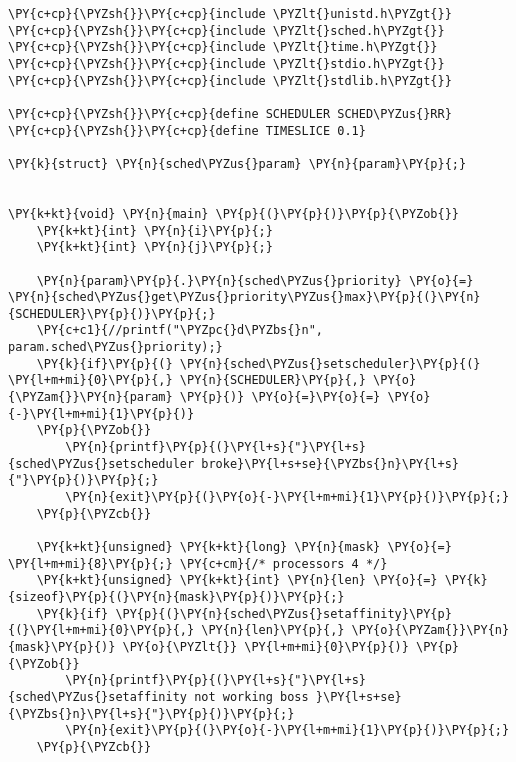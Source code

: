 \begin{Verbatim}[commandchars=\\\{\}]
\PY{c+cp}{\PYZsh{}}\PY{c+cp}{include \PYZlt{}unistd.h\PYZgt{}}
\PY{c+cp}{\PYZsh{}}\PY{c+cp}{include \PYZlt{}sched.h\PYZgt{}}
\PY{c+cp}{\PYZsh{}}\PY{c+cp}{include \PYZlt{}time.h\PYZgt{}}
\PY{c+cp}{\PYZsh{}}\PY{c+cp}{include \PYZlt{}stdio.h\PYZgt{}}
\PY{c+cp}{\PYZsh{}}\PY{c+cp}{include \PYZlt{}stdlib.h\PYZgt{}}

\PY{c+cp}{\PYZsh{}}\PY{c+cp}{define SCHEDULER SCHED\PYZus{}RR}
\PY{c+cp}{\PYZsh{}}\PY{c+cp}{define TIMESLICE 0.1}

\PY{k}{struct} \PY{n}{sched\PYZus{}param} \PY{n}{param}\PY{p}{;}


\PY{k+kt}{void} \PY{n}{main} \PY{p}{(}\PY{p}{)}\PY{p}{\PYZob{}}
    \PY{k+kt}{int} \PY{n}{i}\PY{p}{;}
    \PY{k+kt}{int} \PY{n}{j}\PY{p}{;}

    \PY{n}{param}\PY{p}{.}\PY{n}{sched\PYZus{}priority} \PY{o}{=} \PY{n}{sched\PYZus{}get\PYZus{}priority\PYZus{}max}\PY{p}{(}\PY{n}{SCHEDULER}\PY{p}{)}\PY{p}{;}
    \PY{c+c1}{//printf("\PYZpc{}d\PYZbs{}n", param.sched\PYZus{}priority);}
    \PY{k}{if}\PY{p}{(} \PY{n}{sched\PYZus{}setscheduler}\PY{p}{(} \PY{l+m+mi}{0}\PY{p}{,} \PY{n}{SCHEDULER}\PY{p}{,} \PY{o}{\PYZam{}}\PY{n}{param} \PY{p}{)} \PY{o}{=}\PY{o}{=} \PY{o}{-}\PY{l+m+mi}{1}\PY{p}{)}
    \PY{p}{\PYZob{}}
        \PY{n}{printf}\PY{p}{(}\PY{l+s}{"}\PY{l+s}{sched\PYZus{}setscheduler broke}\PY{l+s+se}{\PYZbs{}n}\PY{l+s}{"}\PY{p}{)}\PY{p}{;}
        \PY{n}{exit}\PY{p}{(}\PY{o}{-}\PY{l+m+mi}{1}\PY{p}{)}\PY{p}{;}
    \PY{p}{\PYZcb{}}

    \PY{k+kt}{unsigned} \PY{k+kt}{long} \PY{n}{mask} \PY{o}{=} \PY{l+m+mi}{8}\PY{p}{;} \PY{c+cm}{/* processors 4 */}
    \PY{k+kt}{unsigned} \PY{k+kt}{int} \PY{n}{len} \PY{o}{=} \PY{k}{sizeof}\PY{p}{(}\PY{n}{mask}\PY{p}{)}\PY{p}{;}
    \PY{k}{if} \PY{p}{(}\PY{n}{sched\PYZus{}setaffinity}\PY{p}{(}\PY{l+m+mi}{0}\PY{p}{,} \PY{n}{len}\PY{p}{,} \PY{o}{\PYZam{}}\PY{n}{mask}\PY{p}{)} \PY{o}{\PYZlt{}} \PY{l+m+mi}{0}\PY{p}{)} \PY{p}{\PYZob{}}
        \PY{n}{printf}\PY{p}{(}\PY{l+s}{"}\PY{l+s}{sched\PYZus{}setaffinity not working boss }\PY{l+s+se}{\PYZbs{}n}\PY{l+s}{"}\PY{p}{)}\PY{p}{;}
        \PY{n}{exit}\PY{p}{(}\PY{o}{-}\PY{l+m+mi}{1}\PY{p}{)}\PY{p}{;}
    \PY{p}{\PYZcb{}}


\end{Verbatim}
